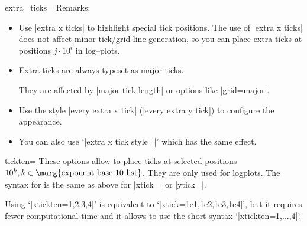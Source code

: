 \begin{pgfplotsxykey}{extra \x\ ticks=}
Remarks:
\begin{itemize} 
\item Use |extra x ticks| to highlight special tick positions. The use of |extra x ticks| does not affect minor tick/grid line generation, so you can place extra ticks at positions $j\cdot 10^i$ in log--plots. 
\item Extra ticks are always typeset as major ticks.

They are affected by |major tick length| or options like |grid=major|.
\item Use the style |every extra x tick| (|every extra y tick|) to configure the appearance.
\item You can also use `|extra x tick style=|' which has the same effect.
\end{itemize}
\end{pgfplotsxykey}


\begin{pgfplotsxykey}{\x tickten=}
These options allow to place ticks at selected positions $10^k, k \in \text{\marg{exponent base 10 list}}$. They are only used for logplots. The syntax for  is the same as above for |xtick=| or |ytick=|.

Using `|xtickten={1,2,3,4}|' is equivalent to `|xtick={1e1,1e2,1e3,1e4}|', but it requires fewer computational time and it allows to use the short syntax `|xtickten={1,...,4}|'.
\begin{codeexample}[]
\end{codeexample}
\end{pgfplotsxykey}

